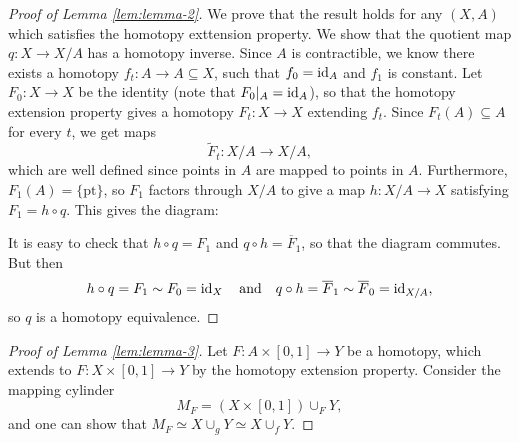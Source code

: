 \begin{proof}[Proof of Lemma \ref{lem:lemma-2}]
  We prove that the result holds for any $(X, A)$
  which satisfies the homotopy exttension property.
  We show that the quotient map $q : X \to X / A$
  has a homotopy inverse. Since $A$ is contractible,
  we know there exists a homotopy $f_t : A \to A \subseteq X$,
  such that $f_0 = \operatorname{id}_A$ and $f_1$ is constant.
  Let $F_0 : X \to X$ be the identity (note that
  $F_0|_A = \operatorname{id}_A$), so that the homotopy extension
  property gives a homotopy
  $F_t : X \to X$ extending $f_t$.
  Since $F_t(A) \subseteq A$ for every $t$, we get maps
  \[
    \widetilde{F}_t : X / A \to X / A,
  \]
  which are well defined since points in $A$ are mapped
  to points in $A$. Furthermore, $F_1(A) = \{\text{pt}\}$,
  so $F_1$ factors through $X / A$ to give a map
  $h : X / A \to X$ satisfying $F_1 = h \circ q$. This
  gives the diagram:
  \begin{center}
  \end{center}
  It is easy to check that $h \circ q = F_1$ and
  $q \circ h = \overline{F}_1$, so that the
  diagram commutes. But then
  \[
    h \circ q = F_1 \sim F_0 = \operatorname{id}_X \quad \text{and} \quad
    q \circ h = \overline{F}_1 \sim \overline{F}_0 = \operatorname{id}_{X / A},
  \]
  so $q$ is a homotopy equivalence.
\end{proof}

\begin{proof}[Proof of Lemma \ref{lem:lemma-3}]
  Let $F : A \times [0, 1] \to Y$ be a homotopy,
  which extends to $F : X \times [0, 1] \to Y$
  by the homotopy extension property. Consider
  the mapping cylinder
  \[
    M_F = (X \times [0, 1]) \cup_F Y,
  \]
  and one can show that
  $M_F \simeq X \cup_g Y \simeq X \cup_f Y$.
\end{proof}
